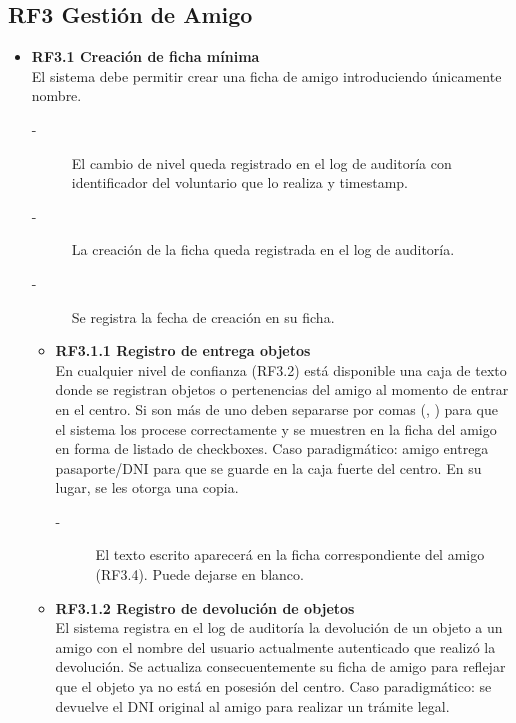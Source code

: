 \subsection{RF3 Gestión de Amigo}
\begin{itemize}
    \item \textbf{RF3.1 Creación de ficha mínima} \\
    El sistema debe permitir crear una ficha de amigo introduciendo
    únicamente nombre.
    \begin{description}
        \item[-] El cambio de nivel queda registrado en el log de auditoría con 
        identificador del voluntario que lo realiza y timestamp.
        \item[-] La creación de la ficha queda registrada en el log de auditoría.
        \item[-] Se registra la fecha de creación en su ficha. 
    \end{description}
    \begin{itemize}
        \item \textbf{RF3.1.1 Registro de entrega objetos} \\
        En cualquier nivel de confianza (RF3.2) está disponible una caja de texto donde se registran objetos o pertenencias 
        del amigo al momento de entrar en el centro. Si son más de uno deben separarse por comas (, ) para que el sistema los procese %
        correctamente y se muestren en la ficha del amigo en forma de listado de checkboxes. Caso paradigmático: amigo entrega pasaporte/DNI para que se guarde en la caja 
        fuerte del centro. En su lugar, se les otorga una copia.
        \begin{description}
            \item[-] El texto escrito aparecerá en la ficha correspondiente del amigo (RF3.4). Puede dejarse en blanco.
        \end{description}
        \item \textbf{RF3.1.2 Registro de devolución de objetos} \\
        El sistema registra en el log de auditoría la devolución de un objeto a un amigo con el nombre del usuario actualmente autenticado que realizó la devolución. Se actualiza consecuentemente su ficha de amigo 
        para reflejar que el objeto ya no está en posesión del centro. Caso paradigmático: se devuelve el DNI original al amigo para realizar un trámite legal.
    \end{itemize}


\end{itemize}
